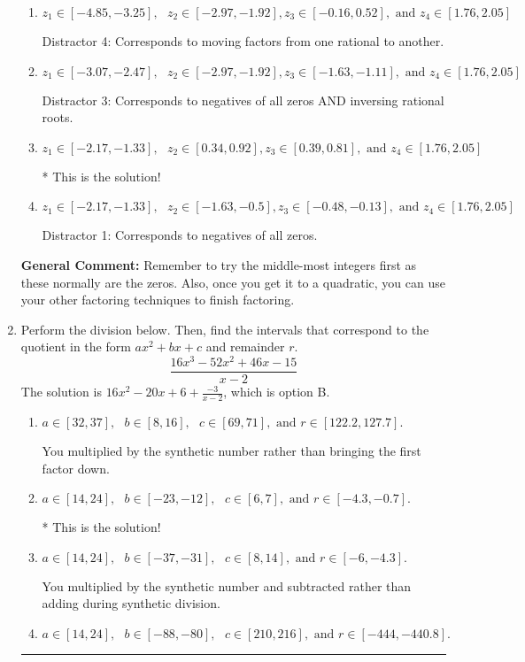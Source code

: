 \documentclass{extbook}[14pt]
\newcommand{\litem}[1]{\item #1

\rule{\textwidth}{0.4pt}}
\begin{document}
\begin{enumerate}
{\begin{enumerate}[label=\Alph*.]
 Distractor 2: Corresponds to inversing rational roots.
\item \( z_1 \in [-4.85, -3.25], \text{   }  z_2 \in [-2.97, -1.92], z_3 \in [-0.16, 0.52], \text{   and   } z_4 \in [1.76, 2.05] \)

 Distractor 4: Corresponds to moving factors from one rational to another.
\item \( z_1 \in [-3.07, -2.47], \text{   }  z_2 \in [-2.97, -1.92], z_3 \in [-1.63, -1.11], \text{   and   } z_4 \in [1.76, 2.05] \)

 Distractor 3: Corresponds to negatives of all zeros AND inversing rational roots.
\item \( z_1 \in [-2.17, -1.33], \text{   }  z_2 \in [0.34, 0.92], z_3 \in [0.39, 0.81], \text{   and   } z_4 \in [1.76, 2.05] \)

* This is the solution!
\item \( z_1 \in [-2.17, -1.33], \text{   }  z_2 \in [-1.63, -0.5], z_3 \in [-0.48, -0.13], \text{   and   } z_4 \in [1.76, 2.05] \)

 Distractor 1: Corresponds to negatives of all zeros.
\end{enumerate}

\textbf{General Comment:} Remember to try the middle-most integers first as these normally are the zeros. Also, once you get it to a quadratic, you can use your other factoring techniques to finish factoring.
}
\litem{
Perform the division below. Then, find the intervals that correspond to the quotient in the form $ax^2+bx+c$ and remainder $r$.
\[ \frac{16x^{3} -52 x^{2} +46 x -15}{x -2} \]The solution is \( 16x^{2} -20 x + 6 + \frac{-3}{x -2} \), which is option B.\begin{enumerate}[label=\Alph*.]
\item \( a \in [32, 37], \text{   } b \in [8, 16], \text{   } c \in [69, 71], \text{   and   } r \in [122.2, 127.7]. \)

 You multiplied by the synthetic number rather than bringing the first factor down.
\item \( a \in [14, 24], \text{   } b \in [-23, -12], \text{   } c \in [6, 7], \text{   and   } r \in [-4.3, -0.7]. \)

* This is the solution!
\item \( a \in [14, 24], \text{   } b \in [-37, -31], \text{   } c \in [8, 14], \text{   and   } r \in [-6, -4.3]. \)

 You multiplied by the synthetic number and subtracted rather than adding during synthetic division.
\item \( a \in [14, 24], \text{   } b \in [-88, -80], \text{   } c \in [210, 216], \text{   and   } r \in [-444, -440.8]. \)


\end{enumerate}}
\end{enumerate}
\end{document}
